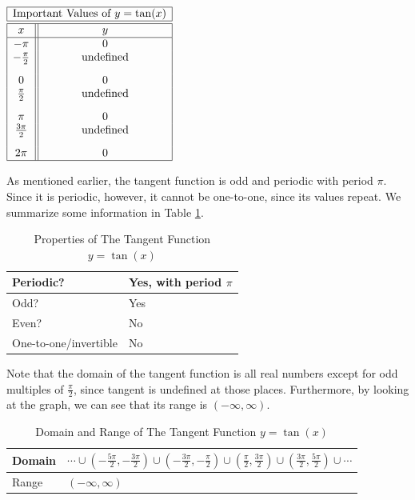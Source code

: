 \documentclass[nooutcomes]{ximera}
\begin{document}
\begin{center}
\(
\begin{array}{ |c || c|  }
 \hline
 \multicolumn{2}{|c|}{\text{\normalfont Important Values of } y=\tan(x)} \\
\hline
 \hline
 x & y\\
 \hline

 -\pi&0\\

 -\frac{\pi}{2}& \text{undefined}\\[2ex]

 0&0\\

 \frac{\pi}{2}&\text{undefined}\\[2ex]

 \pi&0\\

\frac{3\pi}{2}&\text{undefined}\\[2ex]

 2 \pi&0\\
\hline
\end{array}
\)
\end{center} 

As mentioned earlier, the tangent function is odd and periodic with period $\pi$. Since it is periodic, however, it cannot be one-to-one, since its values repeat. We summarize some information in Table \ref{tab:tangentproperties}.

\begin{table}[h]
\caption{\label{tab:tangentproperties}Properties of The Tangent Function $y = \tan(x)$}
\centering
\begin{tabular}{l|l}
Periodic? & Yes, with period $\pi$ \\ \hline
Odd? &  Yes \\ \hline
Even? & No \\ \hline
One-to-one/invertible & No
\end{tabular}
\end{table}

Note that the domain of the tangent function is all real numbers except for odd multiples of $\frac{\pi}{2}$, since tangent is undefined at those places. Furthermore, by looking at the graph, we can see that its range is $(-\infty, \infty)$.

\begin{table}[h]
\caption{\label{tab:tangentdr}Domain and Range of The Tangent Function $y = \tan(x)$}
\centering
\begin{tabular}{l|l}
Domain & $\cdots \cup \left(-\frac{5\pi}{2}, -\frac{3\pi}{2}\right) \cup \left(-\frac{3\pi}{2}, -\frac{\pi}{2}\right) \cup \left(\frac{\pi}{2}, \frac{3\pi}{2}\right) \cup \left(\frac{3\pi}{2}, \frac{5\pi}{2}\right) \cup \cdots$ \\ \hline
Range & $(-\infty, \infty)$
\end{tabular}
\end{table}
\end{document}
